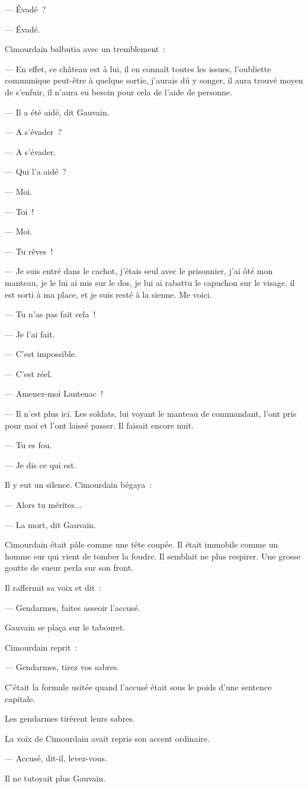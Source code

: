 \documentclass[french,twoside]{book} %
\begin{document}
— Évadé ?\par
 — Évadé.\par
Cimourdain balbutia avec un tremblement :\par
— En effet, ce château est à lui, il en connaît toutes les issues, l’oubliette communique peut-être à quelque sortie, j’aurais dû y songer, il aura trouvé moyen de s’enfuir, il n’aura eu besoin pour cela de l’aide de personne.\par
— Il a été aidé, dit Gauvain.\par
— A s’évader ?\par
— A s’évader.\par
— Qui l’a aidé ?\par
— Moi.\par
— Toi !\par
— Moi.\par
— Tu rêves !\par
— Je suis entré dans le cachot, j’étais seul avec le prisonnier, j’ai ôté mon manteau, je le lui ai mis sur le dos, je lui ai rabattu le capuchon sur le visage, il est sorti à ma place, et je suis resté à la sienne. Me voici.\par
— Tu n’as pas fait cela !\par
— Je l’ai fait.\par
— C’est impossible.\par
— C’est réel.\par
— Amenez-moi Lantenac !\par
— Il n’est plus ici. Les soldats, lui voyant le manteau de commandant, l’ont pris pour moi et l’ont laissé passer. Il faisait encore nuit.\par
— Tu es fou.\par
— Je dis ce qui est.\par
 Il y eut un silence. Cimourdain bégaya :\par
— Alors tu mérites...\par
— La mort, dit Gauvain.\par
Cimourdain était pâle comme une tête coupée. Il était immobile comme un homme sur qui vient de tomber la foudre. Il semblait ne plus respirer. Une grosse goutte de sueur perla sur son front.\par
Il raffermit sa voix et dit :\par
— Gendarmes, faites asseoir l’accusé.\par
Gauvain se plaça sur le tabouret.\par
Cimourdain reprit :\par
— Gendarmes, tirez vos sabres.\par
C’était la formule usitée quand l’accusé était sous le poids d’une sentence capitale.\par
Les gendarmes tirèrent leurs sabres.\par
La voix de Cimourdain avait repris son accent ordinaire.\par
— Accusé, dit-il, levez-vous.\par
Il ne tutoyait plus Gauvain.
\end{document}
